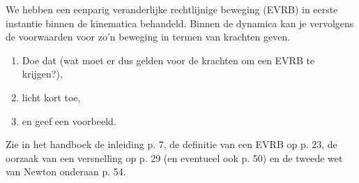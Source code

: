 

\item{}We hebben een eenparig veranderlijke rechtlijnige beweging (EVRB) in eerste instantie binnen de kinematica behandeld. Binnen de dynamica kan je vervolgens de voorwaarden voor zo'n beweging in termen van krachten geven. 

\begin{enumerate}
\item Doe dat (wat moet er dus gelden voor de krachten om een EVRB te krijgen?), 
\item licht kort toe,
\item en geef een voorbeeld.
\end{enumerate}

\begin{oplossing}
Zie in het handboek de inleiding p. 7, de definitie van een EVRB op p. 23, de oorzaak van een versnelling op p. 29 (en eventueel ook p. 50) en de tweede wet van Newton onderaan p. 54.
\end{oplossing}